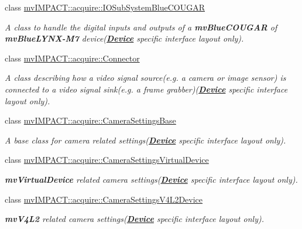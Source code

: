 \begin{DoxyCompactItemize}
class \hyperlink{classmv_i_m_p_a_c_t_1_1acquire_1_1_i_o_sub_system_blue_c_o_u_g_a_r}{mv\+I\+M\+P\+A\+C\+T\+::acquire\+::\+I\+O\+Sub\+System\+Blue\+C\+O\+U\+G\+A\+R}
\begin{DoxyCompactList}\small\item\em A class to handle the digital inputs and outputs of a {\bfseries mv\+Blue\+C\+O\+U\+G\+A\+R} of {\bfseries mv\+Blue\+L\+Y\+N\+X-\/\+M7} device({\bfseries \hyperlink{classmv_i_m_p_a_c_t_1_1acquire_1_1_device}{Device}} specific interface layout only). \end{DoxyCompactList}\item 
class \hyperlink{classmv_i_m_p_a_c_t_1_1acquire_1_1_connector}{mv\+I\+M\+P\+A\+C\+T\+::acquire\+::\+Connector}
\begin{DoxyCompactList}\small\item\em A class describing how a video signal source(e.\+g. a camera or image sensor) is connected to a video signal sink(e.\+g. a frame grabber)({\bfseries \hyperlink{classmv_i_m_p_a_c_t_1_1acquire_1_1_device}{Device}} specific interface layout only). \end{DoxyCompactList}\item 
class \hyperlink{classmv_i_m_p_a_c_t_1_1acquire_1_1_camera_settings_base}{mv\+I\+M\+P\+A\+C\+T\+::acquire\+::\+Camera\+Settings\+Base}
\begin{DoxyCompactList}\small\item\em A base class for camera related settings({\bfseries \hyperlink{classmv_i_m_p_a_c_t_1_1acquire_1_1_device}{Device}} specific interface layout only). \end{DoxyCompactList}\item 
class \hyperlink{classmv_i_m_p_a_c_t_1_1acquire_1_1_camera_settings_virtual_device}{mv\+I\+M\+P\+A\+C\+T\+::acquire\+::\+Camera\+Settings\+Virtual\+Device}
\begin{DoxyCompactList}\small\item\em {\bfseries mv\+Virtual\+Device} related camera settings({\bfseries \hyperlink{classmv_i_m_p_a_c_t_1_1acquire_1_1_device}{Device}} specific interface layout only). \end{DoxyCompactList}\item 
class \hyperlink{classmv_i_m_p_a_c_t_1_1acquire_1_1_camera_settings_v4_l2_device}{mv\+I\+M\+P\+A\+C\+T\+::acquire\+::\+Camera\+Settings\+V4\+L2\+Device}
\begin{DoxyCompactList}\small\item\em {\bfseries mv\+V4\+L2} related camera settings({\bfseries \hyperlink{classmv_i_m_p_a_c_t_1_1acquire_1_1_device}{Device}} specific interface layout only). \end{DoxyCompactList}\item 

\end{DoxyCompactItemize}
